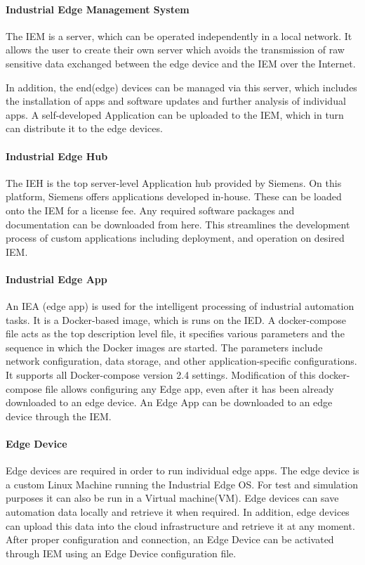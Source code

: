 		\paragraph{Industrial Edge Management System}
			The \gls{IEM} is a server, which can be operated independently in a local network. It allows the user to create their own server which avoids the transmission of raw sensitive data exchanged between the edge device and the IEM over the Internet.

			In addition, the end(edge) devices can be managed via this server, which includes the installation of apps and software updates and further analysis of individual apps. A self-developed Application can be uploaded to the IEM, which in turn can distribute it to the edge devices.\cite{siemensIndustrialEdge}

		\paragraph{Industrial Edge Hub}
			The \gls{IEH} 
			is the top server-level Application hub provided by Siemens. On this platform, Siemens offers applications developed in-house. These can be loaded onto the IEM for a license fee. Any required software packages and documentation can be downloaded from here. This streamlines the development process of custom applications including deployment, and operation on desired IEM.\cite{siemensIndustrialEdge}
		\paragraph{Industrial Edge App}
			An \gls{IEA} (edge app) is used for the intelligent processing of industrial automation tasks.\cite{siemensIndustrialEdge} It is a Docker-based image, which is runs on the IED. A docker-compose file acts as the top description level file, it specifies various parameters and the sequence in which the Docker images are started. The parameters include network configuration, data storage, and other application-specific configurations. It supports all Docker-compose version 2.4 settings. Modification of this docker-compose file allows configuring any Edge app, even after it has been already downloaded to an edge device. An Edge App can be downloaded to an edge device through the IEM.
	
		\paragraph{Edge Device}
		Edge devices are required in order to run individual edge apps. The edge device is a custom Linux Machine running the Industrial Edge OS. For test and simulation purposes it can also be run in a Virtual machine(VM). Edge devices can save automation data locally and retrieve it when required. In addition, edge devices can upload this data into the cloud infrastructure and retrieve it at any moment. After proper configuration and connection,  an Edge Device can be activated through IEM using an Edge Device configuration file.
			
